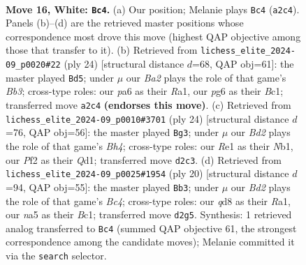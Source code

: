 \documentclass[11pt]{article}
\begin{document}
\clearpage

\begin{figure}[p]\centering
\begin{subfigure}{0.46\textwidth}\centering
\resizebox{\linewidth}{!}{%
\newchessgame
\chessboard[
  setfen={2bq1rk1/r3bp1p/p2p1np1/n1p1p3/Pp2P3/3P1Q1N/BPPB1PPP/RN2R1K1 w - - 0 16},
  showmover=false,
  pgfstyle=straightmove, color=movearrow, markmove={a2-c4}
]}
\caption{}
\end{subfigure}\hfill
\begin{subfigure}{0.46\textwidth}\centering
\resizebox{\linewidth}{!}{%
\newchessgame
\chessboard[
  setfen={r1q2rk1/2pb1pbp/p1np2p1/1p2p2n/3PP3/1BP2N1P/PP3PP1/R1BQRNK1 w - - 7 13},
  showmover=false,
  pgfstyle=straightmove, color=movearrow, markmove={b3-d5}
]}
\caption{}
\end{subfigure}
\\[4pt]
\begin{subfigure}{0.46\textwidth}\centering
\resizebox{\linewidth}{!}{%
\newchessgame
\chessboard[
  setfen={r1bq1rk1/3nbpp1/2pp3p/p3p2n/Pp1PP2B/1B3N2/1PP2PPP/RN1QR1K1 w - - 2 13},
  showmover=false,
  pgfstyle=straightmove, color=movearrow, markmove={h4-g3}
]}
\caption{}
\end{subfigure}\hfill
\begin{subfigure}{0.46\textwidth}\centering
\resizebox{\linewidth}{!}{%
\newchessgame
\chessboard[
  setfen={r1bq1rk1/pp3ppp/1bpp1nn1/4p3/1PB1P3/2PP1N2/P4PPP/R1BQRNK1 w - - 0 11},
  showmover=false,
  pgfstyle=straightmove, color=movearrow, markmove={c4-b3}
]}
\caption{}
\end{subfigure}
\caption{\textbf{Move 16, White: \texttt{Bc4}.} (a) Our position; Melanie plays \texttt{Bc4} (\texttt{a2c4}). Panels (b)--(d) are the retrieved master positions whose correspondence most drove this move (highest QAP objective among those that transfer to it). (b) Retrieved from \texttt{lichess\_elite\_2024-09\_p0020\#22} (ply 24) [structural distance $d$=68, QAP obj=61]: the master played \texttt{Bd5}; under $\mu$ our \emph{Ba2} plays the role of that game's \emph{Bb3}; cross-type roles: our \emph{p}a6 as their \emph{R}a1, our \emph{p}g6 as their \emph{B}c1; transferred move \texttt{a2c4} \textbf{(endorses this move)}. (c) Retrieved from \texttt{lichess\_elite\_2024-09\_p0010\#3701} (ply 24) [structural distance $d$=76, QAP obj=56]: the master played \texttt{Bg3}; under $\mu$ our \emph{Bd2} plays the role of that game's \emph{Bh4}; cross-type roles: our \emph{R}e1 as their \emph{N}b1, our \emph{P}f2 as their \emph{Q}d1; transferred move \texttt{d2c3}. (d) Retrieved from \texttt{lichess\_elite\_2024-09\_p0025\#1954} (ply 20) [structural distance $d$=94, QAP obj=55]: the master played \texttt{Bb3}; under $\mu$ our \emph{Bd2} plays the role of that game's \emph{Bc4}; cross-type roles: our \emph{q}d8 as their \emph{R}a1, our \emph{n}a5 as their \emph{B}c1; transferred move \texttt{d2g5}. Synthesis: 1 retrieved analog transferred to \texttt{Bc4} (summed QAP objective 61, the strongest correspondence among the candidate moves); Melanie committed it via the \texttt{search} selector.}
\label{fig:thought-m30}
\end{figure}
\end{document}
